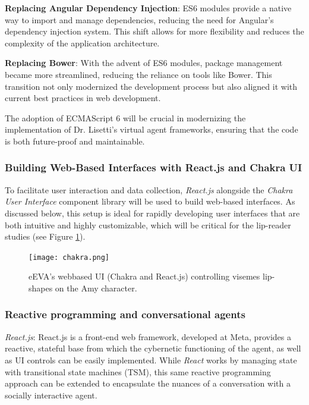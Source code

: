 \documentclass[12pt]{article}
\begin{document}
\textbf{Replacing Angular Dependency Injection}: ES6 modules provide a native way to import and manage dependencies, reducing the need for Angular’s dependency injection system. This shift allows for more flexibility and reduces the complexity of the application architecture.

\textbf{Replacing Bower}: With the advent of ES6 modules, package management became more streamlined, reducing the reliance on tools like Bower. This transition not only modernized the development process but also aligned it with current best practices in web development.

The adoption of ECMAScript 6 will be  crucial in modernizing the implementation of Dr. Lisetti’s virtual agent frameworks, ensuring that the code is both future-proof and maintainable.

\subsubsection{Building Web-Based Interfaces with React.js and Chakra UI}

To facilitate user interaction and data collection, {\em React.js} alongside the {\em Chakra User Interface} component library will be used to build web-based interfaces. As discussed below, this setup is ideal for rapidly developing user interfaces that are both intuitive and highly customizable, which will be critical for the lip-reader studies (see Figure \ref{fig:chakra}).

\begin{figure}
    \centering
    \vspace{-3mm}
    \texttt{[image: chakra.png]}
    \caption{eEVA's webbased UI (Chakra and React.js) controlling visemes lip-shapes on the Amy character. }
    \label{fig:chakra}
\end{figure}
\subsubsection{Reactive programming and conversational agents} 

\textit{React.js}: React.js is a front-end web framework, developed at Meta, provides a reactive, stateful base from which the cybernetic functioning of the agent, as well as UI controls can be easily implemented.
While {\em React} works by managing state with transitional state machines (TSM), this same reactive programming approach can be extended to encapsulate the nuances of a conversation with a socially interactive agent. 
\end{document}
